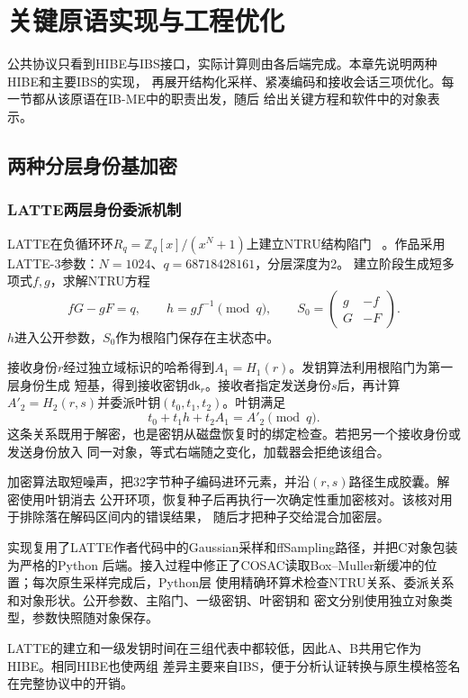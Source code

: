 \chapter{关键原语实现与工程优化}

公共协议只看到HIBE与IBS接口，实际计算则由各后端完成。本章先说明两种HIBE和主要IBS的实现，
再展开结构化采样、紧凑编码和接收会话三项优化。每一节都从该原语在IB-ME中的职责出发，随后
给出关键方程和软件中的对象表示。

\section{两种分层身份基加密}

\subsection{LATTE两层身份委派机制}

LATTE在负循环环$R_q=\mathbb Z_q[x]/(x^N+1)$上建立NTRU结构陷门
~\cite{zhao2024latte}。作品采用LATTE-3参数：$N=1024$、$q=68718428161$，分层深度为2。
建立阶段生成短多项式$f,g$，求解NTRU方程
\[
 fG-gF=q,
 \qquad h=gf^{-1}\pmod q,
 \qquad S_0=\begin{pmatrix}g&-f\\G&-F\end{pmatrix}.
\]
$h$进入公开参数，$S_0$作为根陷门保存在主状态中。

接收身份$r$经过独立域标识的哈希得到$A_1=H_1(r)$。发钥算法利用根陷门为第一层身份生成
短基，得到接收密钥$\mathsf{dk}_r$。接收者指定发送身份$s$后，再计算
$A'_2=H_2(r,s)$并委派叶钥$(t_0,t_1,t_2)$。叶钥满足
\[
 t_0+t_1h+t_2A_1=A'_2\pmod q.
\]
这条关系既用于解密，也是密钥从磁盘恢复时的绑定检查。若把另一个接收身份或发送身份放入
同一对象，等式右端随之变化，加载器会拒绝该组合。

加密算法取短噪声，把32字节种子编码进环元素，并沿$(r,s)$路径生成胶囊。解密使用叶钥消去
公开环项，恢复种子后再执行一次确定性重加密核对。该核对用于排除落在解码区间内的错误结果，
随后才把种子交给混合加密层。

实现复用了LATTE作者代码中的Gaussian采样和ffSampling路径，并把C对象包装为严格的Python
后端。接入过程中修正了COSAC读取Box--Muller新缓冲的位置；每次原生采样完成后，Python层
使用精确环算术检查NTRU关系、委派关系和对象形状。公开参数、主陷门、一级密钥、叶密钥和
密文分别使用独立对象类型，参数快照随对象保存。

LATTE的建立和一级发钥时间在三组代表中都较低，因此A、B共用它作为HIBE。相同HIBE也使两组
差异主要来自IBS，便于分析认证转换与原生模格签名在完整协议中的开销。

